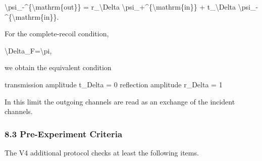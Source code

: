 \documentclass[
]{article}
\newenvironment{Shaded}{}{}
\newcommand{\NormalTok}[1]{#1}
\begin{document}
\begin{Shaded}
\begin{Highlighting}[]
\NormalTok{\textbackslash{}psi\_{-}\^{}\{\textbackslash{}mathrm\{out\}\}}
\NormalTok{=}
\NormalTok{r\_\textbackslash{}Delta \textbackslash{}psi\_+\^{}\{\textbackslash{}mathrm\{in\}\}}
\NormalTok{+}
\NormalTok{t\_\textbackslash{}Delta \textbackslash{}psi\_{-}\^{}\{\textbackslash{}mathrm\{in\}\}.}
\end{Highlighting}
\end{Shaded}

For the complete-recoil condition,

\begin{Shaded}
\begin{Highlighting}[]
\NormalTok{\textbackslash{}Delta\_F=\textbackslash{}pi,}
\end{Highlighting}
\end{Shaded}

we obtain the equivalent condition

\begin{Shaded}
\begin{Highlighting}[]
\NormalTok{transmission amplitude t\_Delta = 0}
\NormalTok{reflection amplitude r\_Delta = 1}
\end{Highlighting}
\end{Shaded}

In this limit the outgoing channels are read as an exchange of the
incident channels.

\subsubsection{8.3 Pre-Experiment
Criteria}\label{pre-experiment-criteria}

The V4 additional protocol checks at least the following items.
\end{document}
